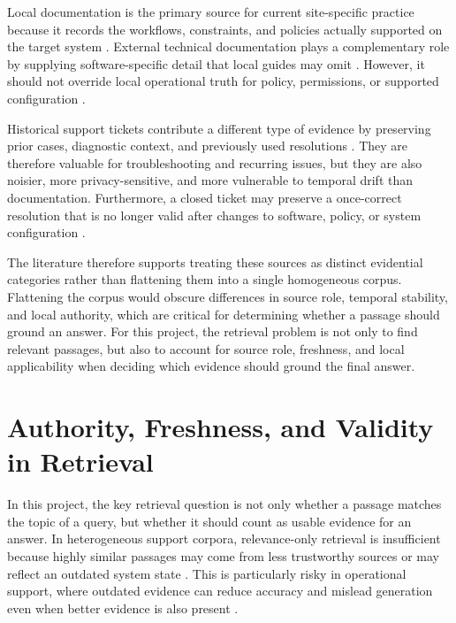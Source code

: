 Local documentation is the primary source for current site-specific practice because it records the workflows, constraints, and policies actually supported on the target system \citep{AskHPC,ResearchComputingServicesDocumentation}. External technical documentation plays a complementary role by supplying software-specific detail that local guides may omit \citep{AskHPC}. However, it should not override local operational truth for policy, permissions, or supported configuration \citep{liYouKnowWhat2024,hwangRetrievalAugmentedGenerationEstimation2025}.

Historical support tickets contribute a different type of evidence by preserving prior cases, diagnostic context, and previously used resolutions \citep{rodenbeckTicketHubEnablingActionable2023,joslinGeneratingFrequentlyAsked2025}. They are therefore valuable for troubleshooting and recurring issues, but they are also noisier, more privacy-sensitive, and more vulnerable to temporal drift than documentation. Furthermore, a closed ticket may preserve a once-correct resolution that is no longer valid after changes to software, policy, or system configuration \citep{joslinGeneratingFrequentlyAsked2025,liYouKnowWhat2024}.

The literature therefore supports treating these sources as distinct evidential categories rather than flattening them into a single homogeneous corpus. Flattening the corpus would obscure differences in source role, temporal stability, and local authority, which are critical for determining whether a passage should ground an answer. For this project, the retrieval problem is not only to find relevant passages, but also to account for source role, freshness, and local applicability when deciding which evidence should ground the final answer. 

\section{Authority, Freshness, and Validity in Retrieval}
\label{sec:authority-freshness-validity}

In this project, the key retrieval question is not only whether a passage matches the topic of a query, but whether it should count as usable evidence for an answer. In heterogeneous support corpora, relevance-only retrieval is insufficient because highly similar passages may come from less trustworthy sources or may reflect an outdated system state \citep{hwangRetrievalAugmentedGenerationEstimation2025,liYouKnowWhat2024}. This is particularly risky in operational support, where outdated evidence can reduce accuracy and mislead generation even when better evidence is also present \citep{ouyangHoHDynamicBenchmark2025}.

